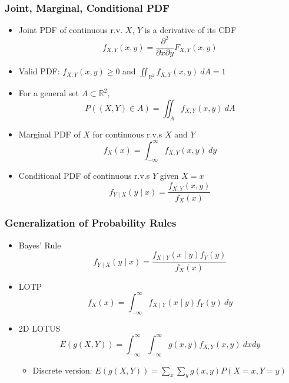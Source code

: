 \subsubsection*{Joint, Marginal, Conditional PDF}
\begin{itemize}
    \item Joint PDF of continuous r.v. $X$, $Y$ is a derivative of its CDF
    \begin{equation}
        f_{X,Y}(x,y)=\frac{\partial^2}{\partial x\partial y}F_{X,Y}(x,y)
    \end{equation}
    \item Valid PDF: $f_{X,Y}(x,y)\geq 0$ and $\iint_{\mathbb{R}^2}f_{X,Y}(x,y)~dA=1$
    \item For a general set $A\subset\mathbb{R}^2$,
    \begin{equation}
        P((X,Y)\in A)=\iint_Af_{X,Y}(x,y)~dA
    \end{equation}
    \item Marginal PDF of $X$ for continuous r.v.s $X$ and $Y$
    \begin{equation}
        f_X(x)=\int_{-\infty}^{\infty}f_{X,Y}(x,y)~dy
    \end{equation}
    \item Conditional PDF of continuous r.v.s $Y$ given $X=x$
    \begin{equation}
        f_{Y\mid X}(y\mid x)=\frac{f_{X,Y}(x,y)}{f_X(x)}
    \end{equation}
\end{itemize}
\clearpage

\subsubsection*{Generalization of Probability Rules}
\begin{itemize}
    \item Bayes' Rule
    \begin{equation}
        f_{Y\mid X}(y\mid x)=\frac{f_{X\mid Y}(x\mid y)f_Y(y)}{f_X(x)}
    \end{equation}
    \item LOTP
    \begin{equation}
        f_X(x)=\int_{-\infty}^{\infty}f_{X\mid Y}(x\mid y)f_Y(y)~dy
    \end{equation}
    \item 2D LOTUS
    \begin{equation}
        E(g(X,Y))=\int_{-\infty}^\infty\int_{-\infty}^\infty g(x,y)f_{X,Y}(x,y)~dxdy
    \end{equation}
    \begin{itemize}
        \item Discrete version: $E(g(X,Y))=\sum_x\sum_yg(x,y)P(X=x,Y=y)$
    \end{itemize}
\end{itemize}


